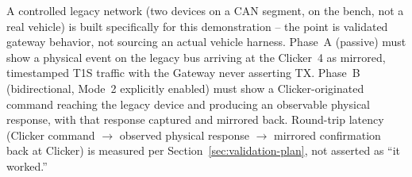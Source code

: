 A controlled legacy network (two devices on a CAN segment, on the bench, not a real vehicle) is built specifically for this demonstration -- the point is validated gateway behavior, not sourcing an actual vehicle harness. Phase~A (passive) must show a physical event on the legacy bus arriving at the Clicker~4 as mirrored, timestamped T1S traffic with the Gateway never asserting TX. Phase~B (bidirectional, Mode~2 explicitly enabled) must show a Clicker-originated command reaching the legacy device and producing an observable physical response, with that response captured and mirrored back. Round-trip latency (Clicker command $\rightarrow$ observed physical response $\rightarrow$ mirrored confirmation back at Clicker) is measured per Section~\ref{sec:validation-plan}, not asserted as ``it worked.''
